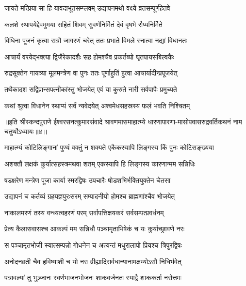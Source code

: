 \twolineshloka
{जायते मत्प्रिया सा हि यावदाभूतसम्प्लवम्}
{उद्यापनमथो वक्ष्ये व्रतसम्पूर्णहेतवे} %

\twolineshloka
{कलशे स्थापयेद्देवमुमया सहितं शिवम्}
{सुवर्णनिर्मितं देवं वृषभे रौप्यनिर्मिते} %

\twolineshloka
{विधिना पूजनं कृत्वा रात्रौ जागरणं चरेत्}
{ततः प्रभाते विमले स्नात्वा नद्यां विधानतः} %

\twolineshloka
{आचार्यं वरयेद्भक्त्या द्विजैरेकादशैः सह}
{होमश्चैव प्रकर्तव्यो घृतपायसबिल्वकैः} %

\twolineshloka
{रुद्रसूक्तेन गायत्र्या मूलमन्त्रेण वा पुनः}
{ततः पूर्णाहुतिं हुत्वा आचार्यादीन्प्रपूजयेत्} %

\twolineshloka
{तथैकादश सद्विप्रान्सपत्नीकांस्तु भोजयेत्}
{एवं या कुरुते नारी सर्वपापैः प्रमुच्यते} %

\twolineshloka
{कथां श्रुत्वा विधानेन स्थाप्यं सर्वं न्यवेदयेत्}
{अश्वमेधसहस्रस्य फलं भवति निश्चितम्} %


{॥इति श्रीस्कन्दपुराणे ईश्वरसनत्कुमारसंवादे श्रावणमासमाहात्म्ये धारणापारणा-मासोपवासरुद्रवर्तिकथनं नाम चतुर्थोऽध्यायः॥४॥}




\twolineshloka
{माहात्म्यं कोटिलिङ्गानां पुण्यं वक्तुं न शक्यते}
{एकैकस्यापि लिङ्गस्य किं पुनः कोटिसङ्ख्यया} %

\twolineshloka
{अशक्तौ लक्षकं कुर्यात्सहस्त्रमथवा शतम्}
{एकस्यापि हि लिङ्गस्य कारणान्मम सन्निधिः} %

\twolineshloka
{षडक्षरेण मन्त्रेण पूजा कार्या स्मरद्विषः}
{उपचारैः षोडशभिर्भक्तियुक्तेन चेतसा} %

\twolineshloka
{उद्यापनं च कर्तव्यं ग्रहयज्ञपुरःसरम्}
{सम्पादनीयो होमश्च ब्राह्मणांश्चैव भोजयेत्} %

\twolineshloka
{नाकालमरणं तस्य वन्ध्यत्वहरणं परम्}
{सर्वापत्तिक्षयकरं सर्वसम्पत्प्रवर्धनम्} %

\twolineshloka
{प्रेत्य कैलासवासश्च आकल्पं मम सन्निधौ}
{पञ्चामृताभिषेकं च यः कुर्याच्छ्रावणे नरः} %

\twolineshloka
{स पञ्चामृतभोजी स्यात्सम्पन्नो गोधनेन च}
{अत्यन्तं मधुरालापो प्रियश्च त्रिपुरद्विषः} %

\twolineshloka
{अनोदनव्रती चैव हविष्याशी च यो नरः}
{व्रीह्यादिसर्वधान्यानामक्षय्योऽसौ निधिर्भवेत्} %

\twolineshloka
{पत्रावल्यां तु भुञ्जानः स्वर्णभाजनभोजनः}
{शाकवर्जनतः स्याद्वै शाककर्ता नरोत्तमः} %

